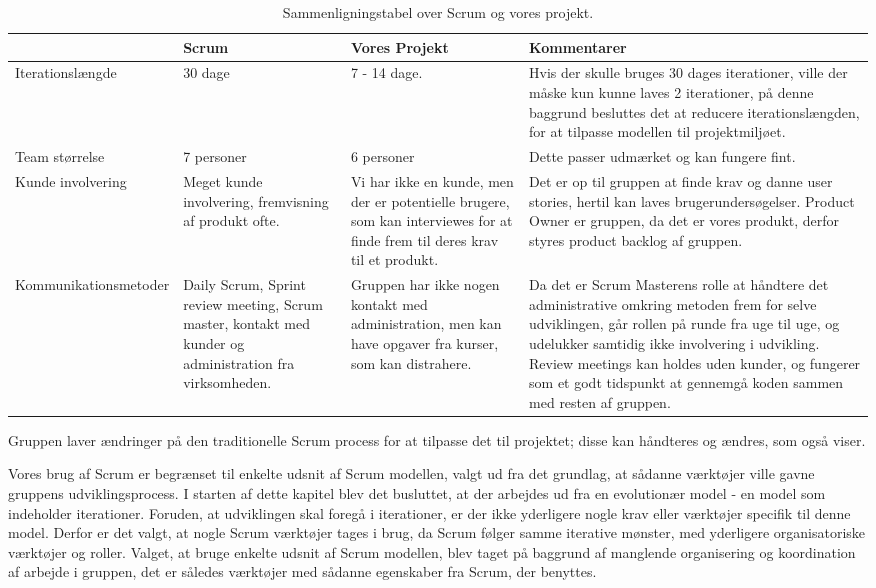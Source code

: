 \begin{sidewaystable}
\centering
      \begin{tabular}{p{5cm}p{5cm}p{5cm}p{5cm}}
	       				 & Scrum  & Vores Projekt & Kommentarer  \\ \hline

	   Iterationslængde  		
	   		& 30 dage 
	   		& 7 - 14 dage. 
	   		& Hvis der skulle bruges 30 dages iterationer, ville der måske kun kunne laves 2 iterationer, på denne baggrund besluttes det at reducere iterationslængden, for at tilpasse modellen til projektmiljøet.\\
	   		
	   Team størrelse    		
	   		& 7 personer
	   		& 6 personer 
	   		& Dette passer udmærket og kan fungere fint. \\
	   		
	   Kunde involvering 		
	   		& Meget kunde involvering, fremvisning af produkt ofte.
	   		& Vi har ikke en kunde, men der er potentielle brugere, som kan interviewes for at finde frem til deres krav til et produkt.
	   		& Det er op til gruppen at finde krav og danne user stories, hertil kan laves brugerundersøgelser. Product Owner er gruppen, da det er vores produkt, derfor styres product backlog af gruppen.\\
	   		
	   Kommunikationsmetoder	
	   		& Daily Scrum, Sprint review meeting, Scrum master, kontakt med kunder og administration fra virksomheden.
	   		& Gruppen har ikke nogen kontakt med administration, men kan have opgaver fra kurser, som kan distrahere. 
	   		& Da det er Scrum Masterens rolle at håndtere det administrative omkring metoden frem for selve udviklingen, går rollen på runde fra uge til uge, og udelukker samtidig ikke involvering i udvikling. Review meetings kan holdes uden kunder, og fungerer som et godt tidspunkt at gennemgå koden sammen med resten af gruppen. \\
    \end{tabular}
  \caption{Sammenligningstabel over Scrum og vores projekt.}\label{tabel:sammenligningstabel}
\end{sidewaystable}

Gruppen laver ændringer på den traditionelle Scrum process for at tilpasse det til projektet; disse kan håndteres og ændres, som  også viser.

Vores brug af Scrum er begrænset til enkelte udsnit af Scrum modellen, valgt ud fra det grundlag, at sådanne værktøjer ville gavne gruppens udviklingsprocess.
I starten af dette kapitel blev det busluttet, at der arbejdes ud fra en evolutionær model - en model som indeholder iterationer.
Foruden, at udviklingen skal foregå i iterationer, er der ikke yderligere nogle krav eller værktøjer specifik til denne model.
Derfor er det valgt, at nogle Scrum værktøjer tages i brug, da Scrum følger samme iterative mønster, med yderligere organisatoriske værktøjer og roller.
Valget, at bruge enkelte udsnit af Scrum modellen, blev taget på baggrund af manglende organisering og koordination af arbejde i gruppen, det er således værktøjer med sådanne egenskaber fra Scrum, der benyttes.

